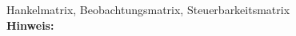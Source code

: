 \begin{question}[section=7,name={Matrix},difficulty=,type=mdl,tags={}]
	Hankelmatrix, Beobachtungsmatrix, Steuerbarkeitsmatrix
	\\ \textbf{Hinweis:}\\
	
\end{question}
\begin{solution}
	
\end{solution}